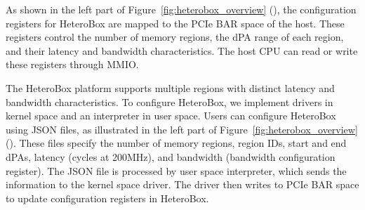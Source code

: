 As shown in the left part of Figure~\ref{fig:heterobox_overview} (\textcolor{red}{\btwo}), the configuration registers for HeteroBox are mapped to the PCIe BAR space of the host. These registers control the number of memory regions, the dPA range of each region, and their latency and bandwidth characteristics. The host CPU can read or write these registers through MMIO.

The HeteroBox platform supports multiple regions with distinct latency and bandwidth characteristics. To configure HeteroBox, we implement drivers in kernel space and an interpreter in user space. Users can configure HeteroBox using JSON files, as illustrated in the left part of Figure~\ref{fig:heterobox_overview} (\textcolor{red}{\bthree}). These files specify the number of memory regions, region IDs, start and end dPAs, latency (cycles at 200MHz), and bandwidth (bandwidth configuration register). The JSON file is processed by user space interpreter, which sends the information to the kernel space driver. The driver then writes to PCIe BAR space to update configuration registers in HeteroBox.